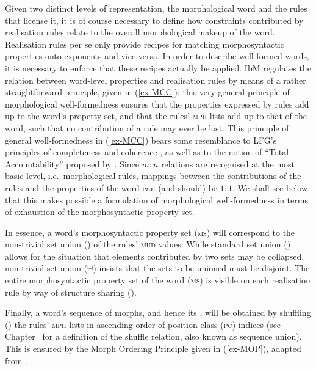 \documentclass[output=paper,biblatex,babelshorthands,newtxmath,draftmode,colorlinks,citecolor=brown]{langscibook}
\begin{document}
\begin{exe}
\begin{xlist}
Given two distinct levels of representation, the morphological word
and the rules that license it, it is of course necessary to define how
constraints contributed by realisation rules relate to the overall
morphological makeup of the word. Realisation rules per se only
provide recipes for matching morphosyntactic properties onto exponents
and vice versa. In order to describe well-formed words, it is
necessary to enforce that these recipes actually be applied. IbM
regulates the relation between word-level properties and realisation
rules by means of a rather straightforward principle, given in
(\ref{ex-MCC}): this very general principle of morphological
well-formedness ensures that the properties expressed by rules add up
to the word's property set, and that the rules' \textsc{mph} lists add
up to that of the word, such that no contribution of a rule may ever
be lost. This principle of general well-formedness in (\ref{ex-MCC})
bears some resemblance to LFG's principles of
completeness and coherence
\citep{bresnan_j82}, as well as to the notion of ``Total
Accountability'' proposed by \citet{Hockett47}. Since $m:n$ relations
are recognised at the most basic level, i.e.\ morphological rules,
mappings between the contributions of the rules and the properties of
the word can (and should) be $1:1$.  We shall see below that this
makes possible a formulation of morphological well-formedness in terms
of exhaustion of the morphosyntactic property set.

In essence, a word's morphosyntactic property set (\textsc{ms}) will
correspond to the non-trivial set union (\isi{$\uplus$}) of the rules'
\textsc{mud} values: While standard set union (\isi{$\cup$}) allows
for the situation that elements contributed by two sets may be
collapsed, non-trivial set union ($\uplus$) insists that the sets to
be unioned must be disjoint. The entire morphosyntactic property set
of the word (\textsc{ms}) is visible on each realisation rule by way
of structure sharing ().

Finally, a word's sequence of morphs, and hence its ,
will be obtained by shuffling (\isi{$\bigcirc$}) the rules'
\textsc{mph} lists in ascending order of position class (\textsc{pc})
indices (see Chapter~\crossrefchaptert[\page
\pageref{rel-shuffle}]{order} for a definition of the shuffle
relation, also known as sequence union). This is ensured by the Morph
Ordering Principle given in
(\ref{ex-MOP}), adapted from \citet{Crysmann:Bonami:2016}.


\end{xlist}
\end{exe}
\end{document}
